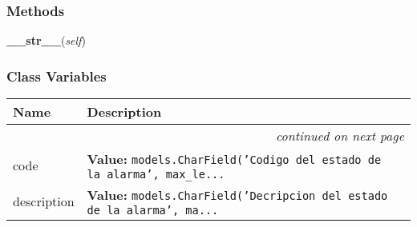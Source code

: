   \subsubsection{Methods}

    \label{GroundSegment:models:Alarms:AlarmState:AlarmState:__str__}

    \vspace{0.5ex}

\hspace{.8\funcindent}\begin{boxedminipage}{\funcwidth}

    \raggedright \textbf{\_\_str\_\_}(\textit{self})

\setlength{\parskip}{2ex}
\setlength{\parskip}{1ex}
    \end{boxedminipage}



  \subsubsection{Class Variables}

    \vspace{-1cm}
\hspace{\varindent}\begin{longtable}{|p{\varnamewidth}|p{\vardescrwidth}|l}
\cline{1-2}
\cline{1-2} \centering \textbf{Name} & \centering \textbf{Description}& \\
\cline{1-2}
\endhead\cline{1-2}\multicolumn{3}{r}{\small\textit{continued on next page}}\\\endfoot\cline{1-2}
\endlastfoot\raggedright c\-o\-d\-e\- & \raggedright \textbf{Value:} 
{\tt models.CharField('Codigo del estado de la alarma', max\_le\texttt{...}}&\\
\cline{1-2}
\raggedright d\-e\-s\-c\-r\-i\-p\-t\-i\-o\-n\- & \raggedright \textbf{Value:} 
{\tt models.CharField('Decripcion del estado de la alarma', ma\texttt{...}}&\\
\cline{1-2}
\end{longtable}

